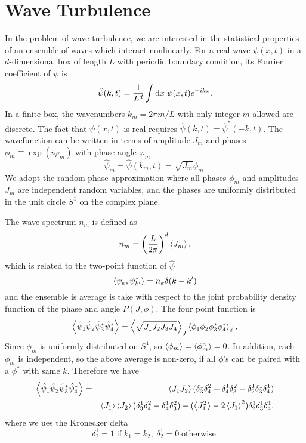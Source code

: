 \newcommand{\abs}[1]{\left|{ #1}\right |}

\chapter{Wave Turbulence}
\label{app:wave-turbulence}
In the problem of wave turbulence, we are interested in the statistical properties of an ensemble of waves which interact nonlinearly.
For a real wave $\psi(x,t)$ in a $d$-dimensional box of length $L$ with periodic boundary condition, its Fourier coefficient of $\psi$ is
\begin{equation}
	\hat{\psi}(k,t) = \frac{1}{L^d}\int \mathrm{d} x\; \psi(x,t)e^{-i k x}.
\end{equation}
In a finite box, the wavenumbers $k_m=2\pi m/L$ with only integer $m$ allowed are discrete. 
The fact that $\psi(x,t)$ is real requires $\hat{\psi}(k,t) = \hat{\psi}^*(-k,t)$.
The wavefunction can be written in terms of amplitude $J_m$ and phases $\phi_m \equiv \exp(i\varphi_m)$ with phase angle $\varphi_m$
%
\begin{equation}
	\hat{\psi}_m = \hat{\psi}(k_m,t) = \sqrt{J_m} {\phi_m}.
\end{equation}
%
We adopt the random phase approximation where all phases $\phi_m$ and amplitudes $J_m$ are independent random variables, and the phases are uniformly distributed in the unit circle $S^1$ on the complex plane.

The wave spectrum $n_m$ is defined as 
\begin{equation}
	n_m = \left(\frac{L}{2\pi}\right)^d\left< J_m\right>,
\end{equation}
which is related to the two-point function of $\hat{\psi}$
\begin{equation}
	\left< \psi_k,\psi^*_{k'}\right> = n_k\delta(k-k')
\end{equation}
and the ensemble is average is take with respect to the joint probability density function of the phase and angle $P(J,\phi)$.
The four point function is
\begin{equation}
	\left< \hat{\psi}_1\hat{\psi}_2\hat{\psi}^*_3\hat{\psi}^*_4\right> = \left< \sqrt{J_1 J_2 J_3 J_4}\right>_J\left< \phi_1\phi_2\phi^*_3\phi^*_4\right>_\phi.
\end{equation}
Since $\phi_m$ is uniformly distributed on $S^1$, so $\left< \phi_m\right>=\left< \phi^n_m\right>=0$. 
In addition, each $\phi_m$ is independent, so the above average is non-zero, if all $\phi$'s can be paired with a $\phi^*$ with same $k$. 
Therefore we have
\begin{eqnarray}
	\left< \hat{\psi}_1\hat{\psi}_2\hat{\psi}^*_3\hat{\psi}^*_4\right> &=& \left< J_1 J_2\right>(\delta_3^1\delta_4^2+\delta_4^1\delta_3^2-\delta_2^1\delta_3^1\delta_4^1)\nonumber\\
	&=&	\left< J_1\right>\left< J_2\right>(\delta_3^1\delta_4^2-\delta_4^1\delta_3^2)-(\left< J_1^2\right>-2\left< J_1\right>^2)\delta_2^1\delta_3^1\delta_4^1.
\end{eqnarray}
where we ues the Kronecker delta
\begin{equation}
	\delta_2^1 = 1\; \mathrm{if}\; k_1=k_2,\; \delta_2^1 = 0\;\mathrm{otherwise}.
\end{equation}

